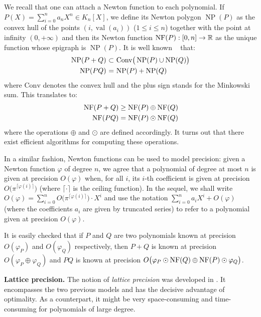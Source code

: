 \documentclass{sig-alternate-2013}
\DeclareMathOperator{\NP}{NP}
\DeclareMathOperator{\val}{val}
\newcommand{\R}{\mathbb R}
\newcommand{\NF}{\text{\rm NF}}
\def\todo#1{\ \!\!{\color{red} #1}}
\begin{document}
We recall that one can attach a Newton function to each polynomial.
If $P(X) = \sum_{i=0}^n a_n X^n \in K_n[X]$, we define its Newton
polygon $\NP(P)$ as the convex hull of the points $(i,\val(a_i))$ 
($1 \leq i \leq n$) together with the point at infinity $(0,+\infty)$
and then its Newton function $\NF(P) : [0,n] \to \R$ as the unique
function whose epigraph is $\NP(P)$. It is well known \todo{(Give a
reference?)} that:
$$\begin{array}{r@{\,\,}c@{\,\,}l}
\NP(P+Q) & \subset & \text{Conv}\big(\NP(P) \cup \NP(Q)\big) \smallskip \\
\NP(PQ) & = & \NP(P) + \NP(Q)
\end{array}$$
where $\text{Conv}$ denotes the convex hull and the plus sign stands 
for the Minkowski sum. This translates to:
$$\begin{array}{r@{\,\,}c@{\,\,}l}
\NF(P+Q) \geq \NF(P) \oplus \NF(Q) \smallskip \\
\NF(PQ) = \NF(P) \odot \NF(Q)
\end{array}$$
where the operations $\oplus$ and $\odot$ are defined accordingly.
It turns out that there exist efficient algorithms for computing these 
operations.

In a similar fashion, Newton functions can be used to model precision: 
given a Newton function $\varphi$ of degree $n$, we agree that a polynomial 
of degree at most $n$ is given at precision $O(\varphi)$ when, for all $i$,
its $i$-th coefficient is given at precision $O\big(\pi^{\lceil \varphi(i)
\rceil}\big)$ (where $\lceil \cdot \rceil$ is the ceiling function).
In the sequel, we shall write
$O(\varphi) = \sum_{i=0}^n O\big(\pi^{\lceil \varphi(i) \rceil}\big) \cdot X^i$
and use the notation $\sum_{i=0}^n a_i X^i + O(\varphi)$ (where the
coefficients $a_i$ are given by truncated series) to refer to a 
polynomial given at precision $O(\varphi)$.

It is easily checked that if $P$ and $Q$ are two polynomials known at 
precision $O(\varphi_P)$ and $O(\varphi_Q)$ respectively, then $P+Q$ is 
known at precision $O(\varphi_P \oplus \varphi_Q)$ and $PQ$ is known at 
precision $O\big(\varphi_P \odot \NF(Q) \oplus \NF(P) \odot 
\varphi_Q\big)$.

\medskip

\noindent
{\bf Lattice precision.}
The notion of \emph{lattice precision} was developed in 
\cite{padicprec}. It encompasses the two previous models and has
the decisive advantage of optimality. As a counterpart, it might be
very space-consuming and time-consuming for polynomials of large
degree.
\end{document}
